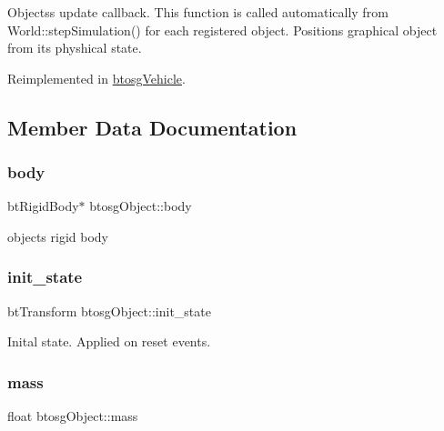 Objects\textquotesingle{}s update callback. This function is called automatically from World\+::step\+Simulation() for each registered object. Positions graphical object from its physhical state. 

Reimplemented in \mbox{\hyperlink{classbtosgVehicle_a5fd0f471df492ac232c9b772a28bd2b9}{btosg\+Vehicle}}.



\subsection{Member Data Documentation}
\mbox{\label{classbtosgObject_a64ccde0543c184ed1749fdb9c9699785}} 
\subsubsection{\texorpdfstring{body}{body}}
{\footnotesize\ttfamily bt\+Rigid\+Body$\ast$ btosg\+Object\+::body\hspace{0.3cm}{\ttfamily [inherited]}}



object\textquotesingle{}s rigid body 

\mbox{\label{classbtosgObject_a2dee023f311114e200df9b04c8c1b400}} 
\subsubsection{\texorpdfstring{init\_state}{init\_state}}
{\footnotesize\ttfamily bt\+Transform btosg\+Object\+::init\+\_\+state\hspace{0.3cm}{\ttfamily [inherited]}}



Inital state. Applied on reset events. 

\mbox{\label{classbtosgObject_a2418bb2194d5e9b0f1c51c84672ba7d1}} 
\subsubsection{\texorpdfstring{mass}{mass}}
{\footnotesize\ttfamily float btosg\+Object\+::mass\hspace{0.3cm}{\ttfamily [inherited]}}



